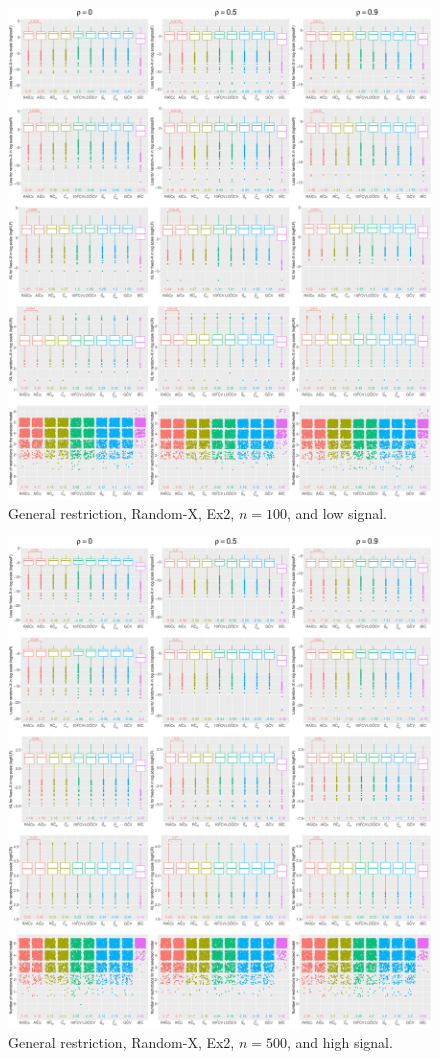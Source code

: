 \begin{figure}[!ht]
\centering
\includegraphics[width=\textwidth]{figures/supplement/randomx/general_restriction/Ex2_n100_lsnr.eps}
\caption{General restriction, Random-X, Ex2, $n=100$, and low signal.}
\end{figure}
\clearpage
\begin{figure}[!ht]
\centering
\includegraphics[width=\textwidth]{figures/supplement/randomx/general_restriction/Ex2_n500_hsnr.eps}
\caption{General restriction, Random-X, Ex2, $n=500$, and high signal.}
\end{figure}
